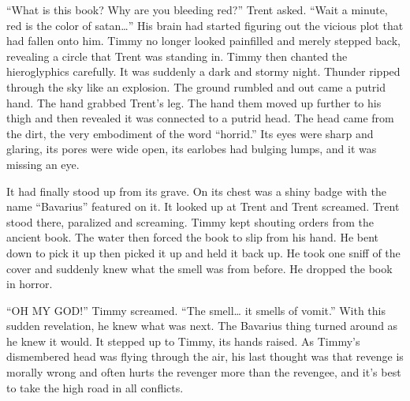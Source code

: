 ``What is this book? Why are you bleeding red?'' Trent asked. ``Wait a
minute, red is the color of satan{\ldots}'' His brain had started
figuring out the vicious plot that had fallen onto him. Timmy no
longer looked painfilled and merely stepped back, revealing a
circle that Trent was standing in. Timmy then chanted the
hieroglyphics carefully. It was suddenly a dark and stormy night.
Thunder ripped through the sky like an explosion. The ground
rumbled and out came a putrid hand. The hand grabbed Trent's leg.
The hand them moved up further to his thigh and then revealed it
was connected to a putrid head. The head came from the dirt, the
very embodiment of the word ``horrid.'' Its eyes were sharp and
glaring, its pores were wide open, its earlobes had bulging lumps,
and it was missing an eye.



It had finally stood up from its grave. On its chest was a shiny
badge with the name ``Bavarius'' featured on it. It looked up at
Trent and Trent screamed. Trent stood there, paralized and
screaming. Timmy kept shouting orders from the ancient book. The
water then forced the book to slip from his hand. He bent down to
pick it up then picked it up and held it back up. He took one sniff
of the cover and suddenly knew what the smell was from before. He
dropped the book in horror.



``OH MY GOD!'' Timmy screamed. ``The smell{\ldots} it smells of vomit.''
With this sudden revelation, he knew what was next. The Bavarius
thing turned around as he knew it would. It stepped up to Timmy,
its hands raised. As Timmy's dismembered head was flying
through the air, his last thought was that revenge is morally wrong
and often hurts the revenger more than the revengee, and it's best
to take the high road in all conflicts. 

 






